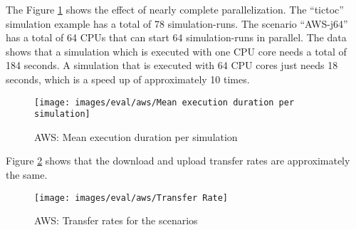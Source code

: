 The Figure \ref{fig:eval-aws-duration} shows the effect of nearly complete parallelization. The “tictoc” simulation example has a total of 78 simulation-runs. The scenario “AWS-j64” has a total of 64 CPUs that can start 64 simulation-runs in parallel. The data shows that a simulation which is executed with one CPU core needs a total of 184 seconds. A simulation that is executed with 64 CPU cores just needs 18 seconds, which is a speed up of approximately 10 times.

\begin{figure}[h]
  \centering
  \texttt{[image: images/eval/aws/Mean execution duration per simulation]}
  \caption{AWS: Mean execution duration per simulation}
  \label{fig:eval-aws-duration}
\end{figure}

Figure \ref{fig:eval-aws-transfer} shows that the download and upload transfer rates are approximately the same.

\begin{figure}[h]
  \centering
  \texttt{[image: images/eval/aws/Transfer Rate]}
  \caption{AWS: Transfer rates for the scenarios}
  \label{fig:eval-aws-transfer}
\end{figure}
